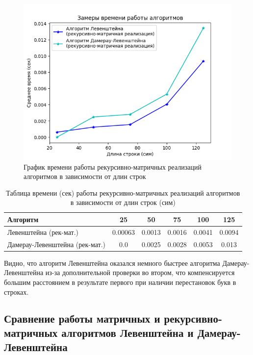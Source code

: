 \begin{figure}[H]
    \centering
    \includegraphics[width=1\textwidth]{img/graph_rec-mat.png}
    \caption{График времени работы рекурсивно-матричных реализаций алгоритмов в зависимости от длин строк}
    \label{fig:graph_rec-mat}
\end{figure}

\begin{table}[H]
    \centering
    \caption{Таблица времени (сек) работы рекурсивно-матричных реализаций алгоритмов в зависимости от длин строк (сим)}
    \begin{tabular}{|l|c|c|c|c|c|}
        \hline
        \textbf{Алгоритм} & \textbf{25} & \textbf{50} & \textbf{75} & \textbf{100} & \textbf{125}\\
        \hline
        Левенштейна (рек-мат.) & 0.00063 & 0.0013 & 0.0016 & 0.0041 & 0.0094 \\
        Дамерау-Левенштейна (рек-мат.) & 0.0 & 0.0025 & 0.0028 & 0.0053 & 0.013  \\
        \hline
    \end{tabular}
    \label{table:table_rec-mat}
\end{table}

Видно, что алгоритм Левенштейна оказался немного быстрее алгоритма Дамерау-Левенштейна из-за дополнительной проверки во втором, что компенсируется большим расстоянием в результате первого при наличии перестановок букв в строках.

\subsection{Сравнение работы матричных и рекурсивно-матричных алгоритмов Левенштейна и Дамерау-Левенштейна}

